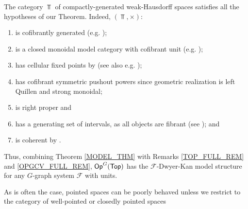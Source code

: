 \documentclass[a4paper,10pt
,draft
]{article}%
\renewcommand{\F}{\mathcal F}
\renewcommand{\1}{\eta}%
\begin{document}
      


\begin{example}
      The category $\Top$ of compactly-generated weak-Hausdorff spaces satisfies all the hypotheses of our Theorem.
      Indeed, $(\Top, \times)$:
      \begin{enumerate}[label = (\roman*)]\itemsep-4pt
      \item is cofibrantly generated (e.g. \cite{Pia91});
      \item is a closed monoidal model category with cofibrant unit (e.g. \cite[Prop. 4.2.11]{Hov99});
      \item has cellular fixed points by \cite{Pia91} (see also e.g. \cite[Lemma 3.18]{Ste16});
      \item has cofibrant symmetric pushout powers since geometric realization is left Quillen and strong monoidal;
      \item is right proper and
      \item has a generating set of intervals, as all objects are fibrant (see \cite[Lemma 2.1]{BM13}); and
      \item is coherent by \cite[Lem. 4.16]{BV73}.
      \end{enumerate}
      Thus, combining Theorem \ref{MODEL_THM} with Remarks \ref{TOP_FULL_REM} and \ref{OPGCV_FULL_REM},
      $\mathsf{Op}^G(\mathsf{Top})$ has the $\F$-Dwyer-Kan model structure for any $G$-graph system $\F$ with units.

      As is often the case, pointed spaces can be poorly behaved unless we restrict to the category of well-pointed or closedly pointed spaces 
\end{example}
\end{document}
